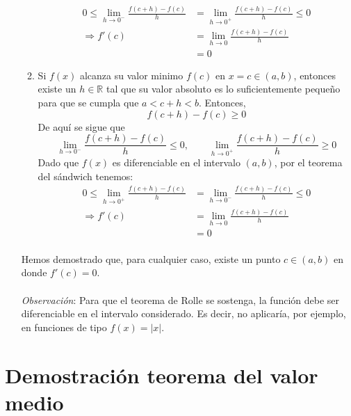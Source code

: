 \documentclass[letter]{article}
\begin{document}
\begin{enumerate}
\begin{enumerate}
\begin{equation*}
\begin{split}
                0\le\lim_{h\rightarrow0^{-}}\frac{f(c+h)-f(c)}{h}
                &= \lim_{h\rightarrow0^{+}}\frac{f(c+h)-f(c)}{h}\le0\\
                \Rightarrow f'(c)
                &= \lim_{h\rightarrow0}\frac{f(c+h)-f(c)}{h}\\
                &= 0
            \end{split}
        \end{equation*}
        \item %
        Si $f(x)$ alcanza su valor minimo $f(c)$ en $x=c\in(a,b)$, entonces existe un $h\in\mathbb{R}$ tal que su valor absoluto es lo suficientemente pequeño para que se cumpla que $a<c+h<b$. Entonces,
        $$f(c+h)-f(c)\ge0$$
        De aquí se sigue que
        $$\lim_{h\rightarrow0^{-}}\frac{f(c+h)-f(c)}{h}\le0,\qquad\lim_{h\rightarrow0^{+}}\frac{f(c+h)-f(c)}{h}\ge0$$
        Dado que $f(x)$ es diferenciable en el intervalo $(a,b)$, por el teorema del sándwich tenemos:
        \begin{equation*}
            \begin{split}
                0\le\lim_{h\rightarrow0^{+}}\frac{f(c+h)-f(c)}{h}
                &= \lim_{h\rightarrow0^{-}}\frac{f(c+h)-f(c)}{h}\le0\\
                \Rightarrow f'(c)
                &= \lim_{h\rightarrow0}\frac{f(c+h)-f(c)}{h}\\
                &= 0
            \end{split}
        \end{equation*}
    \end{enumerate}
    \paragraph{} Hemos demostrado que, para cualquier caso, existe un punto $c\in(a,b)$ en donde $f'(c)=0$.
    \paragraph{}\textit{Observación}: Para que el teorema de Rolle se sostenga, la función debe ser diferenciable en el intervalo considerado. Es decir, no aplicaría, por ejemplo, en funciones de tipo $f(x)=|x|$.
\end{enumerate}


\section{Demostración teorema del valor medio}
\end{document}
